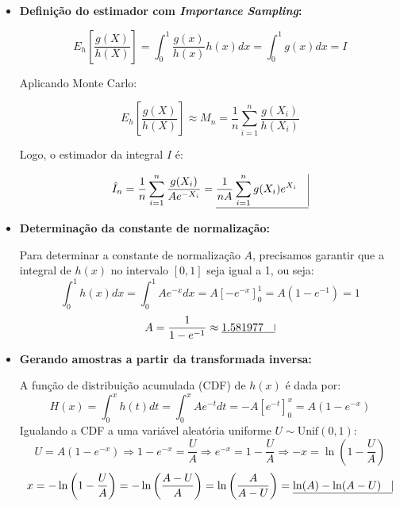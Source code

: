 \documentclass[12 pt]{article}
\begin{document}
\begin{enumerate}
\begin{tcolorbox}[colframe=black, title=Resposta:]
\begin{itemize}
        \item \textbf{Definição do estimador com \textit{Importance Sampling}:}
        
        $$
        E_h\left[\frac{g(X)}{h(X)}\right] = \int_0^1 \frac{g(x)}{h(x)} h(x) dx = \int_0^1 g(x) dx = I
        $$

        Aplicando Monte Carlo:
        
        $$
        E_h\left[\frac{g(X)}{h(X)}\right] \approx M_n = \frac{1}{n} \sum_{i=1}^n \frac{g(X_i)}{h(X_i)}
        $$

        Logo, o estimador da integral $I$ é:

        $$
        \hat{I}_n = \frac{1}{n} \sum_{i=1}^n \frac{g(X_i)}{Ae^{-X_i}} = \underline{\frac{1}{nA} \sum_{i=1}^n g(X_i) e^{X_i} \quad \vline} 
        $$


        \item  \textbf{Determinação da constante de normalização:}
        
        Para determinar a constante de normalização $A$, precisamos garantir que a integral de $h(x)$ no intervalo $[0, 1]$ seja igual a 1, ou seja:
        $$
        \int_0^1 h(x) dx = \int_0^1 Ae^{-x} dx = A \left[-e^{-x}\right]_0^1 = A(1 - e^{-1}) = 1
        $$
        $$
        A = \frac{1}{1 - e^{-1}} \approx  \underline{1.581977 \quad \vline}
        $$

        

        \item \textbf{Gerando amostras a partir da transformada inversa:}
        
        A função de distribuição acumulada (CDF) de $h(x)$ é dada por:
        $$
        H(x) = \int_0^x h(t) dt = \int_0^x Ae^{-t} dt = -A\left[e^{-t}\right]_0^x = A(1 - e^{-x})
        $$
        Igualando a CDF a uma variável aleatória uniforme $U \sim \text{Unif}(0, 1)$:
        $$
        U = A(1 - e^{-x}) \Rightarrow 1 - e^{-x} = \frac{U}{A} \Rightarrow e^{-x} = 1 - \frac{U}{A} \Rightarrow -x = \ln\left(1 - \frac{U}{A}\right)
        $$
        $$
        x = -\ln\left(1 - \frac{U}{A}\right) = -\ln\left(\frac{A - U}{A}\right) = \ln\left(\frac{A}{A - U}\right) =  \underline{\ln(A) -\ln(A - U) \quad \vline}
        $$

        \end{itemize}
    \end{tcolorbox}
       
    \begin{tcolorbox}[colframe=black, title=Resposta (continuação):]
        


\end{tcolorbox}
\end{enumerate}
\end{document}
